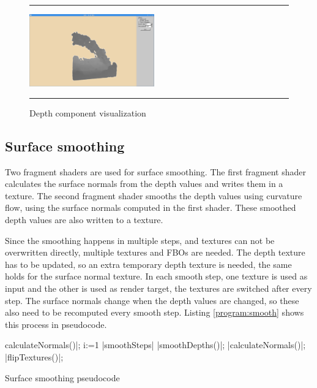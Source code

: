 \begin{figure}[!th]
\hrule
\begin{center}
\vspace*{2ex}\includegraphics[width=0.48\textwidth,clip=true,trim=10cm 1cm 10cm 3cm]{pictures/depth.png}
\end{center}
\caption{Depth component visualization}
\label{fig:depth} 
\vspace*{2ex}
\hrule
\end{figure}

\subsection{Surface smoothing}
Two fragment shaders are used for surface smoothing.
The first fragment shader calculates the surface normals from the depth values and writes them in a texture.
The second fragment shader smooths the depth values using curvature flow, using the surface normals computed in the first shader.
These smoothed depth values are also written to a texture.

Since the smoothing happens in multiple steps, and textures can not be overwritten directly, multiple textures and FBOs are needed.
The depth texture has to be updated, so an extra temporary depth texture is needed, the same holds for the surface normal texture.
In each smooth step, one texture is used as input and the other is used as render target, the textures are switched after every step.
The surface normals change when the depth values are changed, so these also need to be recomputed every smooth step.
Listing \ref{program:smooth} shows this process in pseudocode.

\begin{algorithm}
	\begin{program}
	\caption
	|calculateNormals()|;
	\FOR i:=1 \TO |smoothSteps| \DO
		|smoothDepths()|;
		|calculateNormals()|;
		|flipTextures()|;
	\end{program}
	\label{program:smooth}
	\caption{Surface smoothing pseudocode}
\end{algorithm}

